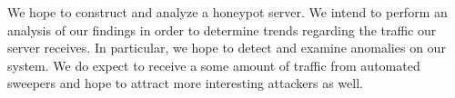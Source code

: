 We hope to construct and analyze a honeypot server. We intend to perform an analysis of our findings in order to determine trends regarding the traffic our server receives. In particular, we hope to detect and examine anomalies on our system. We do expect to receive a some amount of traffic from automated sweepers and hope to attract more interesting attackers as well.